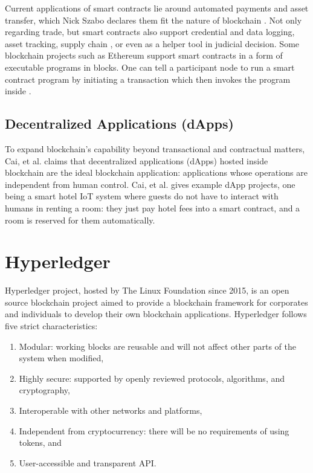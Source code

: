 \documentclass[a4paper,12pt,oneside, utf8x]{report}
\begin{document}
Current applications of smart contracts lie around automated payments and asset transfer, which Nick Szabo declares them fit the nature of blockchain \cite{y22}. Not only regarding trade, but smart contracts also support credential and data logging, asset tracking, supply chain \cite{y22}, or even as a helper tool in judicial decision. Some blockchain projects such as Ethereum support smart contracts in a form of executable programs in blocks. One can tell a participant node to run a smart contract program by initiating a transaction which then invokes the program inside \cite{y24}.

\subsection{Decentralized Applications (dApps)}
To expand blockchain’s capability beyond transactional and contractual matters, Cai, et al. \cite{y24} claims that decentralized applications (dApps) hosted inside blockchain are the ideal blockchain application: applications whose operations are independent from human control. Cai, et al. gives example dApp projects, one being a smart hotel IoT system where guests do not have to interact with humans in renting a room: they just pay hotel fees into a smart contract, and a room is reserved for them automatically.

\section{Hyperledger \cite{h25}}
Hyperledger project, hosted by The Linux Foundation since 2015, is an open source blockchain project aimed to provide a blockchain framework for corporates and individuals to develop their own blockchain applications. Hyperledger follows five strict characteristics:
\begin{enumerate}
\item Modular: working blocks are reusable and will not affect other parts of the system when modified,
\item Highly secure: supported by openly reviewed protocols, algorithms, and cryptography,
\item Interoperable with other networks and platforms,
\item Independent from cryptocurrency: there will be no requirements of using tokens, and
\item User-accessible and transparent API.
\end{enumerate}
\end{document}
